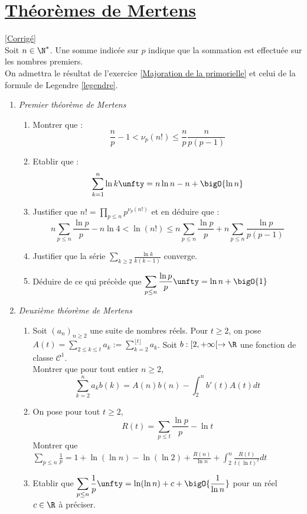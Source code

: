 \documentclass[8pt]{book}
\begin{document}
\section{\underline{Théorèmes de Mertens} }
\label{Théorème de Mertens}
\textcolor{blue}{\hyperref[Théorèmes de Mertens corrigé]{[Corrigé]}}\\
Soit $n\in \N^*$. Une somme indicée sur $p$ indique que la sommation est effectuée sur les nombres premiers.
\\ On admettra le résultat de l'exercice \ref{Majoration de la primorielle} et celui de la formule de Legendre \ref{legendre}.
\begin{enumerate} 
	\item \textit{Premier théorème de Mertens}
	\begin{enumerate}[label=\alph*.]
		\item Montrer que : $$\frac{n}{p}-1<\nu_p(n!)\leq\frac{n}{p}\frac{n}{p(p-1)}$$
		\item Etablir que : $$\sum_{k=1}^n \ln k\unfty=n\ln n-n+\bigO{\ln n}$$
		\item Justifier que $\displaystyle n!=\prod_{p\leq n}p^{\nu_p(n!)}$ et en déduire que :
		$$n\sum_{p\leq n}\frac{\ln p}{p}-n\ln 4<\ln(n!)\leq n\sum_{p\leq n}\frac{\ln p}{p}+n\sum_{p\leq n}\frac{\ln p}{p(p-1)}$$
		\item Justifier que la série $\displaystyle\sum_{k\geq2}\frac{\ln k}{k(k-1)}$ converge.
		\item Déduire de ce qui précède que $\displaystyle\sum_{p\leq n}\frac{\ln p}{p}\unfty=\ln n+\bigO{1}$
	\end{enumerate}
	
	\item \textit{Deuxième théorème de Mertens} 
	\begin{enumerate}[label=\alph*.]
		\item Soit $(a_n)_{n\geq 2}$ une suite de nombres réels. Pour $t\geq 2$, on pose $A(t)=\displaystyle\sum_{2\leq k\leq t}a_k:=\sum_{k=2}^{\lfloor t\rfloor}a_k$.
		Soit $b:[2,+\infty[\to\R$ une fonction de classe $\mathcal C^1$.
		\\Montrer que pour tout entier $n\geq2$, $$\sum_{k=2}^na_kb(k)=A(n)b(n)-\int_2^nb'(t)A(t)dt$$
		\item On pose pour tout $t\geq 2$, $$R(t)=\sum_{p\leq t}\frac{\ln p}{p}-\ln t$$
		Montrer que $\displaystyle\sum_{p\leq n}\frac{1}{p}=1+\ln(\ln n)-\ln(\ln 2)+\frac{R(n)}{\ln n}+\int_2^n\frac{R(t)}{t(\ln t)^2}dt$
		\item Etablir que $\displaystyle\sum_{p\leq n}\frac{1}{p}\unfty=\ln(\ln n)+c+\bigO{\frac{1}{\ln n}}$ pour un réel $c\in\R$ à préciser.
	\end{enumerate}
\end{enumerate}
\end{document}

